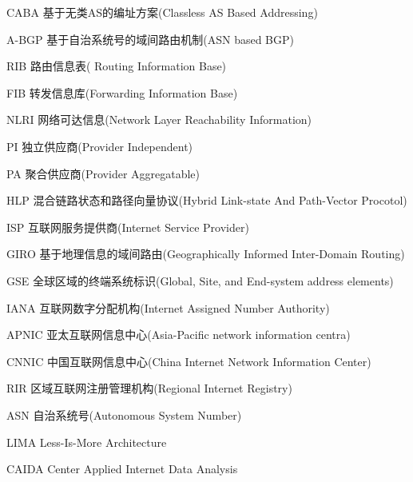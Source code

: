 \begin{denotation}

\item[CABA]  基于无类AS的编址方案(Classless AS Based Addressing)
\item[A-BGP] 基于自治系统号的域间路由机制(ASN based BGP)
\item[RIB] 路由信息表( Routing Information Base)
\item[FIB] 转发信息库(Forwarding Information Base)
\item[NLRI] 网络可达信息(Network Layer Reachability Information)
\item[PI] 独立供应商(Provider Independent)
\item[PA] 聚合供应商(Provider Aggregatable)
\item[HLP] 混合链路状态和路径向量协议(Hybrid Link-state And Path-Vector Procotol)
\item[ISP] 互联网服务提供商(Internet Service Provider)
\item[GIRO] 基于地理信息的域间路由(Geographically Informed Inter-Domain Routing)
\item[GSE] 全球区域的终端系统标识(Global, Site, and End-system address elements)
\item[IANA] 互联网数字分配机构(Internet Assigned Number Authority)
\item[APNIC] 亚太互联网信息中心(Asia-Pacific network information centra)
\item[CNNIC] 中国互联网信息中心(China Internet Network Information Center)
\item[RIR] 区域互联网注册管理机构(Regional Internet Registry)
\item[ASN] 自治系统号(Autonomous System Number)
\item[LIMA] Less-Is-More Architecture
\item[CAIDA] Center Applied Internet Data Analysis

\end{denotation}
